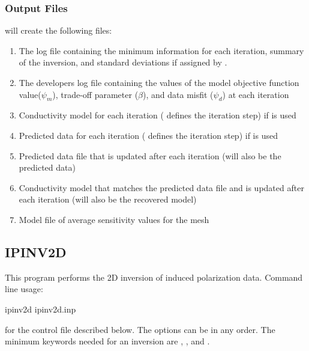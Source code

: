 \subsubsection{Output Files}
 will create the following files:
\begin{enumerate}
\item {} The log file containing the minimum information for each iteration, summary of the inversion, and standard deviations if assigned by .
\item {} The developers log file containing the values of the model objective function value($\psi_m$), trade-off parameter ($\beta$), and data misfit ($\psi_d$) at each iteration 
\item {} Conductivity model for each iteration ( defines the iteration step) if  is used
\item {}  Predicted data for each iteration ( defines the iteration step) if  is used
\item {} Predicted data file that is updated after each iteration (will also be the  predicted data)
\item {} Conductivity model that matches the predicted data file and is updated after each iteration (will also be the  recovered model)
\item {} Model file of average sensitivity values for the mesh
\end{enumerate}


\subsection{IPINV2D}
This program performs the 2D inversion of induced polarization data. Command line usage:

\begin{fileExample}
ipinv2d ipinv2d.inp 
\end{fileExample}
for the control file  described below. The options can be in any order. The minimum keywords needed for an inversion are , , and .

